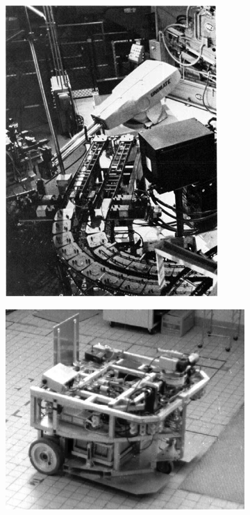 \begin{figure}[h]
    \centering
    \begin{subfigure}{0.3\textwidth}
        \includegraphics[width=\textwidth]{figures/1961unimate.jpg}
        \caption{}
        \label{fig:unimate}
    \end{subfigure}%
    \hspace{0.5cm}
    \begin{subfigure}{0.5\textwidth}
        \includegraphics[width=\textwidth]{figures/hilare.png}
        \caption{}
        \label{fig:hilare}
    \end{subfigure}%


\end{figure}
